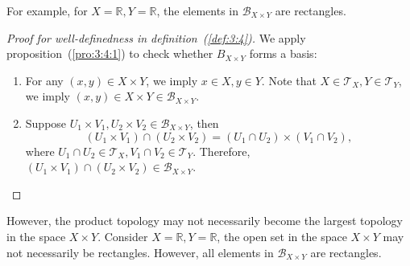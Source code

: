 For example, for $X=\mathbb{R},Y=\mathbb{R}$, the elements in $\mathcal{B}_{X\times Y}$ are rectangles.
\begin{proof}[Proof for well-definedness in definition~(\ref{def:3:4})]
We apply proposition~(\ref{pro:3:4:1}) to check whether $B_{X\times Y}$ forms a basis:
\begin{enumerate}
\item
For any $(x,y)\in X\times Y$, we imply $x\in X,y\in Y$. Note that $X\in\mathcal{T}_X,Y\in\mathcal{T}_Y$, we imply $(x,y)\in X\times Y\in\mathcal{B}_{X\times Y}$.
\item
Suppose $U_1\times V_1,U_2\times V_2\in\mathcal{B}_{X\times Y}$, then 
\[
(U_1\times V_1)\cap(U_2\times V_2)=(U_1\cap U_2)\times (V_1\cap V_2),
\]
where $U_1\cap U_2\in\mathcal{T}_X,V_1\cap V_2\in\mathcal{T}_Y$. Therefore, $(U_1\times V_1)\cap(U_2\times V_2)\in\mathcal{B}_{X\times Y}$.
\end{enumerate}
\end{proof}
\begin{remark}
However, the product topology may not necessarily become the largest topology in the space $X\times Y$. Consider $X=\mathbb{R},Y=\mathbb{R}$, the open set in the space $X\times Y$ may not necessarily be rectangles. However, all elements in $\mathcal{B}_{X\times Y}$ are rectangles.
\end{remark}




